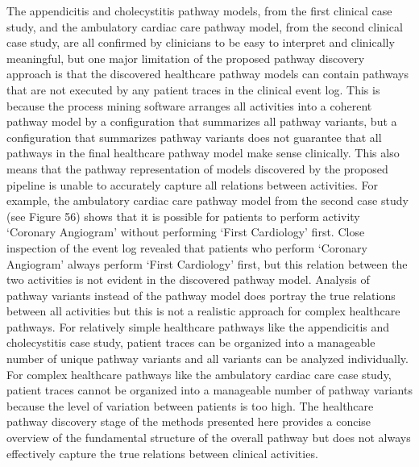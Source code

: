 The appendicitis and cholecystitis pathway models, from the first clinical case study, and the ambulatory cardiac care pathway model, from the second clinical case study, are all confirmed by clinicians to be easy to interpret and clinically meaningful, but one major limitation of the proposed pathway discovery approach is that the discovered healthcare pathway models can contain pathways that are not executed by any patient traces in the clinical event log. This is because the process mining software arranges all activities into a coherent pathway model by a configuration that summarizes all pathway variants, but a configuration that summarizes pathway variants does not guarantee that all pathways in the final healthcare pathway model make sense clinically. This also means that the pathway representation of models discovered by the proposed pipeline is unable to accurately capture all relations between activities. For example, the ambulatory cardiac care pathway model from the second case study (see Figure 56) shows that it is possible for patients to perform activity ‘Coronary Angiogram’ without performing ‘First Cardiology’ first. Close inspection of the event log revealed that patients who perform ‘Coronary Angiogram’ always perform ‘First Cardiology’ first, but this relation between the two activities is not evident in the discovered pathway model. Analysis of pathway variants instead of the pathway model does portray the true relations between all activities but this is not a realistic approach for complex healthcare pathways. For relatively simple healthcare pathways like the appendicitis and cholecystitis case study, patient traces can be organized into a manageable number of unique pathway variants and all variants can be analyzed individually. For complex healthcare pathways like the ambulatory cardiac care case study, patient traces cannot be organized into a manageable number of pathway variants because the level of variation between patients is too high. The healthcare pathway discovery stage of the methods presented here provides a concise overview of the fundamental structure of the overall pathway but does not always effectively capture the true relations between clinical activities. 
